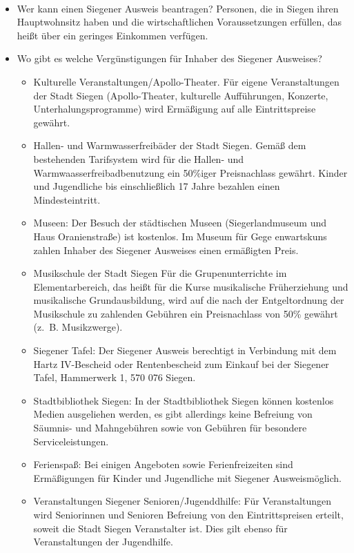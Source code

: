 \paragraph{}
\begin{itemize}
	\item Wer kann einen Siegener Ausweis beantragen? Personen, die in Siegen ihren Hauptwohnsitz haben und die wirtschaftlichen Voraussetzungen erfüllen, das heißt über ein geringes Einkommen verfügen. 
	\item Wo gibt es welche Vergünstigungen für Inhaber des Siegener Ausweises? 
	\begin{itemize}
		\item Kulturelle Veranstaltungen/Apollo-Theater. Für eigene Veranstaltungen der Stadt Siegen (Apollo-Theater, kulturelle Aufführungen, Konzerte, Unterhalungsprogramme) wird Ermäßigung auf alle Eintrittspreise gewährt.
		\item Hallen- und Warmwasserfreibäder der Stadt Siegen. Gemäß dem bestehenden Tarifsystem wird für die Hallen- und Warmwaasserfreibadbenutzung ein 50\%iger Preisnachlass gewährt. Kinder und Jugendliche bis einschließlich 17 Jahre bezahlen einen Mindesteintritt. 
		\item Museen: Der Besuch der städtischen Museen (Siegerlandmuseum und Haus Oranienstraße) ist kostenlos. Im Museum für Gege enwartskuns zahlen Inhaber des Siegener Ausweises einen ermäßigten Preis.
		\item Musikschule der Stadt Siegen Für die Grupenunterrichte im Elementarbereich, das heißt für die Kurse musikalische Früherziehung und musikalische Grundausbildung, wird auf die nach der Entgeltordnung der Musikschule zu zahlenden Gebühren ein Preisnachlass von 50\% gewährt (z.~B. Musikzwerge). 
		\item Siegener Tafel: Der Siegener Ausweis berechtigt in Verbindung mit dem Hartz IV-Bescheid oder Rentenbescheid zum Einkauf bei der Siegener Tafel, Hammerwerk 1, 570 076 Siegen. 
		\item Stadtbibliothek Siegen: In der Stadtbibliothek Siegen können kostenlos  Medien ausgeliehen werden, es gibt allerdings keine Befreiung von Säumnis- und Mahngebühren sowie von Gebühren für besondere Serviceleistungen. 
		\item Ferienspaß: Bei einigen Angeboten sowie Ferienfreizeiten sind Ermäßigungen für Kinder und Jugendliche mit Siegener 
		Ausweismöglich. 
		\item Veranstaltungen Siegener Senioren/Jugenddhilfe: Für Veranstaltungen wird Seniorinnen und Senioren Befreiung von den  Eintrittspreisen erteilt, soweit die Stadt Siegen Veranstalter ist. Dies gilt ebenso für Veranstaltungen der Jugendhilfe. 

\end{itemize}
\end{itemize}
